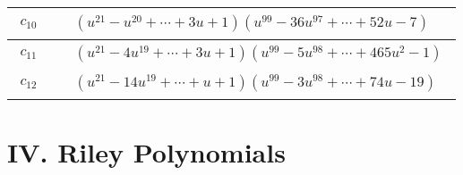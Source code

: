 \documentclass[1p]{elsarticle_modified}
\theoremstyle{definition}
\begin{document}
\begin{tabular}{m{50pt}|m{274pt}}
\hline $$\begin{aligned}c_{10}\end{aligned}$$&$\begin{aligned}
&(u^{21}- u^{20}+\cdots+3 u+1)(u^{99}-36 u^{97}+\cdots+52 u-7)
\end{aligned}$\\
\hline $$\begin{aligned}c_{11}\end{aligned}$$&$\begin{aligned}
&(u^{21}-4 u^{19}+\cdots+3 u+1)(u^{99}-5 u^{98}+\cdots+465 u^2-1)
\end{aligned}$\\
\hline $$\begin{aligned}c_{12}\end{aligned}$$&$\begin{aligned}
&(u^{21}-14 u^{19}+\cdots+u+1)(u^{99}-3 u^{98}+\cdots+74 u-19)
\end{aligned}$\\
\hline
\end{tabular}\newpage\renewcommand{\arraystretch}{1}
\centering \section*{ IV. Riley Polynomials}
\end{document}

